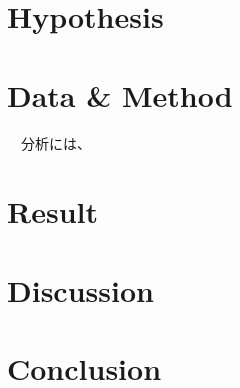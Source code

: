 \documentclass{article}
\begin{document}
\section*{Hypothesis}

\section*{Data \& Method}
　分析には、

\section*{Result}

\section*{Discussion}

\section*{Conclusion}


\end{document}
